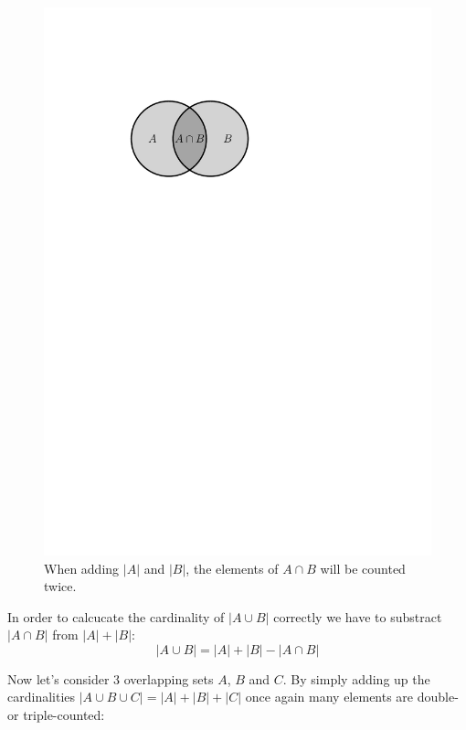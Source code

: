 \begin{figure}[htb]
  \centering
  \includegraphics[scale=.5]{02_higher_combinatorics/pics/a_cut_b.pdf}
  \caption{When adding $|A|$ and $|B|$, the elements of $A \cap B$ will be counted twice.}
\end{figure}

In order to calcucate the cardinality of $|A \cup B|$ correctly we have to substract
$|A \cap B|$ from $|A| + |B|$:
\[
  |A \cup B| = |A| + |B| - |A \cap B|
\]

Now let's consider 3 overlapping sets $A$, $B$ and $C$. By simply adding up the cardinalities
$|A \cup B \cup C| = |A| + |B| + |C|$ once again many elements are double- or triple-counted:

